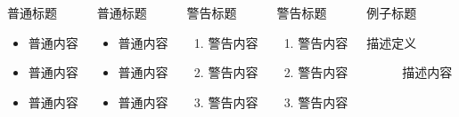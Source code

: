\documentclass[algorithm,pgfplots]{styles/cuzbeamer}
\begin{document}
    \begin{frame}
        \begin{columns}[T,onlytextwidth]
            \begin{block}{普通标题}
                \begin{itemize}
                    \item 普通内容
                    \item 普通内容
                    \item 普通内容
                \end{itemize}
            \end{block}
            \begin{block}{普通标题}
                \begin{itemize}
                    \item 普通内容
                    \item 普通内容
                    \item 普通内容
                \end{itemize}
            \end{block}
            \begin{alertblock}{警告标题}
                \begin{enumerate}
                    \item 警告内容
                    \item 警告内容
                    \item 警告内容
                \end{enumerate}
            \end{alertblock}
            \begin{alertblock}{警告标题}
                \begin{enumerate}
                    \item 警告内容
                    \item 警告内容
                    \item 警告内容
                \end{enumerate}
            \end{alertblock}
            \begin{exampleblock}{例子标题}
                \begin{description}
                    \item[描述定义] 描述内容

\end{description}
\end{exampleblock}
\end{columns}
\end{frame}
\end{document}
